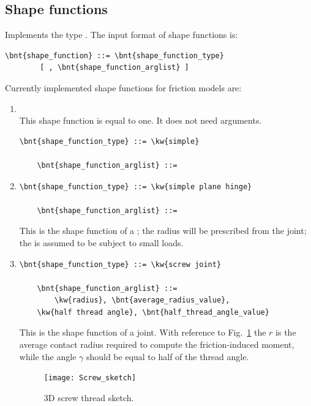 \subsection{Shape functions}
\label{sec:shape function}
Implements the type .
The input format of shape functions is:
\begin{Verbatim}[commandchars=\\\{\}]
    \bnt{shape_function} ::= \bnt{shape_function_type}
        [ , \bnt{shape_function_arglist} ]
\end{Verbatim}
Currently implemented shape functions for friction models are:
\begin{enumerate}
    \item {}\\
    This shape function is equal to one. It does not need arguments.
\begin{Verbatim}[commandchars=\\\{\}]
    \bnt{shape_function_type} ::= \kw{simple}

    \bnt{shape_function_arglist} ::=
\end{Verbatim}

    \item {}
\begin{Verbatim}[commandchars=\\\{\}]
    \bnt{shape_function_type} ::= \kw{simple plane hinge}

    \bnt{shape_function_arglist} ::= 
\end{Verbatim}
    This is the shape function of a ; the radius will be prescribed from the
    joint; the  is assumed to be subject to small loads.

    \item {}
\begin{Verbatim}[commandchars=\\\{\}]
    \bnt{shape_function_type} ::= \kw{screw joint}

    \bnt{shape_function_arglist} ::= 
        \kw{radius}, \bnt{average_radius_value},
	\kw{half thread angle}, \bnt{half_thread_angle_value}
\end{Verbatim}
    This is the shape function of a  joint. 
    With reference to Fig.~\ref{fig:screw_sketch_3D} the  $r$
    is the average contact radius required to compute the friction-induced moment, while 
    the  angle $\gamma$ should be equal to half of the thread angle.
  \begin{figure}[h]
    \begin{center}
      \texttt{[image: Screw\_sketch]}
    \end{center}
    \caption{3D screw thread sketch.}
    \label{fig:screw_sketch_3D}
  \end{figure}


\end{enumerate}
